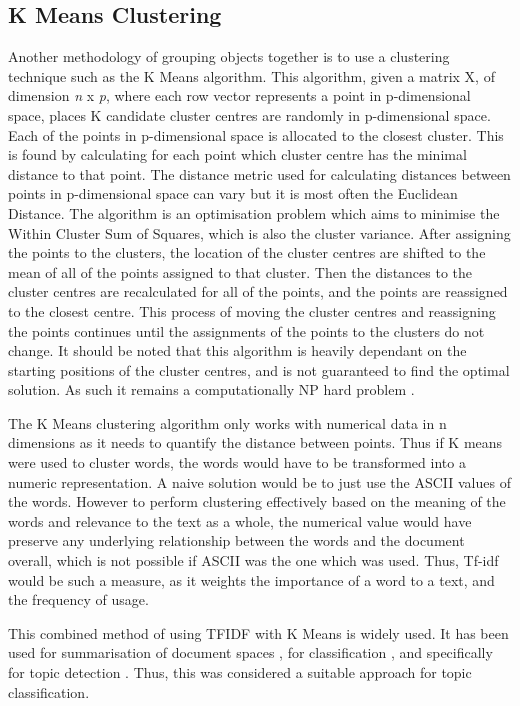  
\subsection{K Means Clustering}
Another methodology of grouping objects together is to use a clustering technique such as the K Means algorithm. This algorithm, given a matrix X, of dimension \textit{n} x \textit{p}, where each row vector represents a point in p-dimensional space, places K candidate cluster centres are randomly in p-dimensional space. Each of the points in p-dimensional space is allocated to the closest cluster. This is found by calculating for each point which cluster centre has the minimal distance to that point. The distance metric used for calculating distances between points in p-dimensional space can vary but it is most often the Euclidean Distance. The algorithm is an optimisation problem which aims to minimise the Within Cluster Sum of Squares, which is also the cluster variance. After assigning the points to the clusters, the location of the cluster centres are shifted to the mean of all of the points assigned to that cluster. Then the distances to the cluster centres are recalculated for all of the points, and the points are reassigned to the closest centre. This process of moving the cluster centres and reassigning the points continues until the assignments of the points to the clusters do not change. It should be noted that this algorithm is heavily dependant on the starting positions of the cluster centres, and is not guaranteed to find the optimal solution. As such it remains a computationally NP hard problem \cite{vattani2009hardness}. 
 
The K Means clustering algorithm only works with numerical data in n dimensions as it needs to quantify the distance between points. Thus if K means were used to cluster words, the words would have to be transformed into a numeric representation. A naive solution would be to just use the ASCII values of the words. However to perform clustering effectively based on the meaning of the words and relevance to the text as a whole, the numerical value would have preserve any underlying relationship between the words and the document overall, which is not possible if ASCII was the one which was used. Thus, Tf-idf would be such a measure, as it weights the importance of a word to a text, and the frequency of usage. 

This combined method of using TFIDF with K Means is widely used. It has been used for summarisation of document spaces \cite{khan2019extractive}, for classification \cite{buana2012combination}, and specifically for topic detection \cite{6066301}. Thus, this was considered a suitable approach for topic classification.

